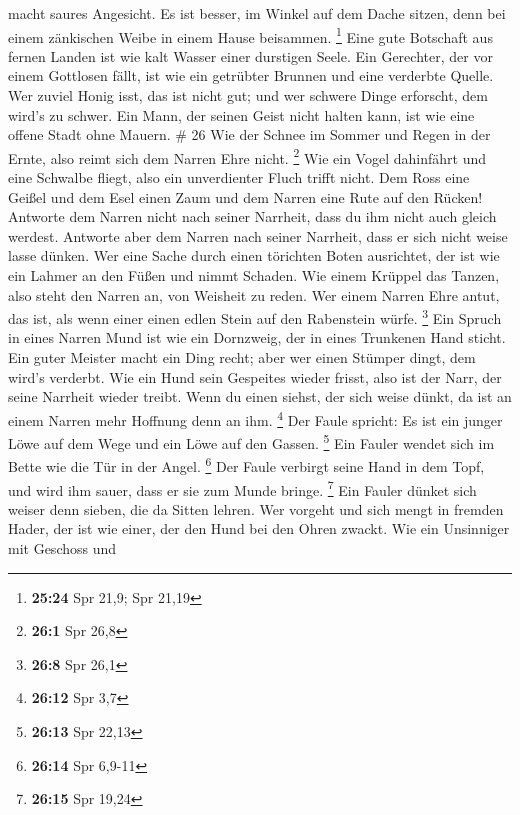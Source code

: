 macht saures Angesicht.  Es ist besser, im Winkel auf dem
Dache sitzen, denn bei einem zänkischen Weibe in einem Hause beisammen.
\footnote{\textbf{25:24} Spr 21,9; Spr 21,19}  Eine gute
Botschaft aus fernen Landen ist wie kalt Wasser einer durstigen Seele.
 Ein Gerechter, der vor einem Gottlosen fällt, ist wie ein
getrübter Brunnen und eine verderbte Quelle.  Wer zuviel
Honig isst, das ist nicht gut; und wer schwere Dinge erforscht, dem
wird's zu schwer.  Ein Mann, der seinen Geist nicht halten
kann, ist wie eine offene Stadt ohne Mauern. \# 26  Wie der
Schnee im Sommer und Regen in der Ernte, also reimt sich dem Narren Ehre
nicht. \footnote{\textbf{26:1} Spr 26,8}  Wie ein Vogel
dahinfährt und eine Schwalbe fliegt, also ein unverdienter Fluch trifft
nicht.  Dem Ross eine Geißel und dem Esel einen Zaum und dem
Narren eine Rute auf den Rücken!  Antworte dem Narren nicht
nach seiner Narrheit, dass du ihm nicht auch gleich werdest.
 Antworte aber dem Narren nach seiner Narrheit, dass er sich
nicht weise lasse dünken.  Wer eine Sache durch einen
törichten Boten ausrichtet, der ist wie ein Lahmer an den Füßen und
nimmt Schaden.  Wie einem Krüppel das Tanzen, also steht den
Narren an, von Weisheit zu reden.  Wer einem Narren Ehre
antut, das ist, als wenn einer einen edlen Stein auf den Rabenstein
würfe. \footnote{\textbf{26:8} Spr 26,1}  Ein Spruch in
eines Narren Mund ist wie ein Dornzweig, der in eines Trunkenen Hand
sticht.  Ein guter Meister macht ein Ding recht; aber wer
einen Stümper dingt, dem wird's verderbt.  Wie ein Hund
sein Gespeites wieder frisst, also ist der Narr, der seine Narrheit
wieder treibt.  Wenn du einen siehst, der sich weise dünkt,
da ist an einem Narren mehr Hoffnung denn an ihm. \footnote{\textbf{26:12}
  Spr 3,7}  Der Faule spricht: Es ist ein junger Löwe auf
dem Wege und ein Löwe auf den Gassen. \footnote{\textbf{26:13} Spr 22,13}
 Ein Fauler wendet sich im Bette wie die Tür in der Angel.
\footnote{\textbf{26:14} Spr 6,9-11}  Der Faule verbirgt
seine Hand in dem Topf, und wird ihm sauer, dass er sie zum Munde
bringe. \footnote{\textbf{26:15} Spr 19,24}  Ein Fauler
dünket sich weiser denn sieben, die da Sitten lehren.  Wer
vorgeht und sich mengt in fremden Hader, der ist wie einer, der den Hund
bei den Ohren zwackt.  Wie ein Unsinniger mit Geschoss und
